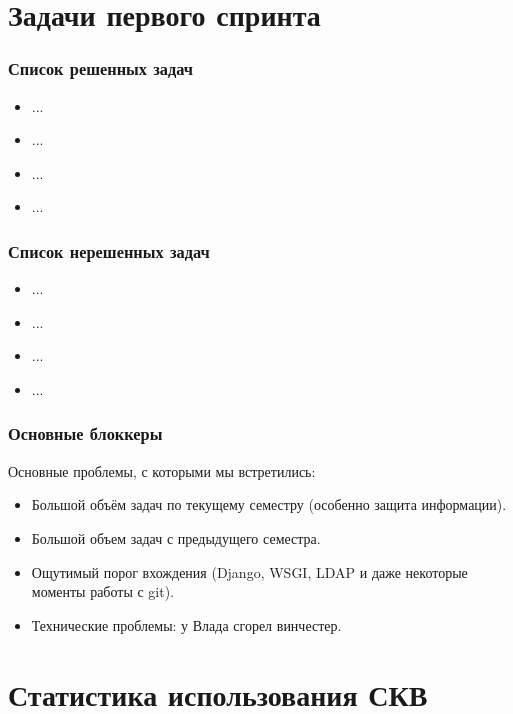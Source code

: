 \documentclass{beamer}
\newlength{\wideitemsep}
\let\olditem\item
\renewcommand{\item}{\setlength{\itemsep}{\wideitemsep}\olditem}
\begin{document}
\section{Задачи первого спринта}

\begin{frame}
\frametitle{Список решенных задач}

\begin{itemize}
\item ...
\item ...
\item ...
\item ...
\end{itemize}


\end{frame}


\begin{frame}
\frametitle{Список нерешенных задач}

\begin{itemize}
\item ...
\item ...
\item ...
\item ...
\end{itemize}


\end{frame}


\begin{frame}
\frametitle{Основные блоккеры}

Основные проблемы, с которыми мы встретились:
\begin{itemize}
\item Большой объём задач по текущему семестру (особенно защита информации).
\item Большой объем задач с предыдущего семестра.
\item Ощутимый порог вхождения (Django, WSGI, LDAP и даже некоторые моменты работы с git).
\item Технические проблемы: у Влада сгорел винчестер.
\end{itemize}


\end{frame}

\section{Статистика использования СКВ}
\end{document}
